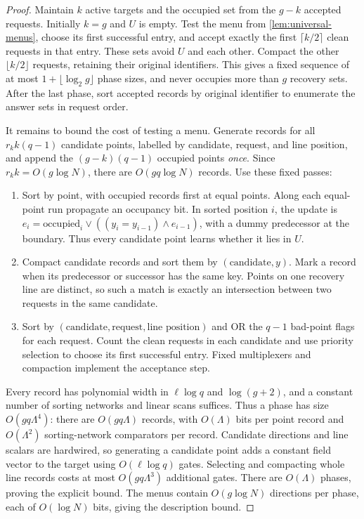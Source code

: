\documentclass[11pt]{article}
\begin{document}
\begin{proof}
Maintain $k$ active targets and the occupied set from the $g-k$ accepted
requests.  Initially $k=g$ and $U$ is empty.  Test the menu from
\cref{lem:universal-menus}, choose its first successful entry, and accept
exactly the first $\lceil k/2\rceil$ clean requests in that entry.  These
sets avoid $U$ and each other.  Compact the other $\lfloor k/2\rfloor$
requests, retaining their original identifiers.  This gives a fixed sequence
of at most $1+\lfloor\log_2 g\rfloor$ phase sizes, and never occupies more
than $g$ recovery sets.  After the last phase, sort accepted records by original
identifier to enumerate the answer sets in request order.

It remains to bound the cost of testing a menu.  Generate records for all
$r_k k(q-1)$ candidate points, labelled by candidate, request, and line
position, and append the $(g-k)(q-1)$ occupied points \emph{once}.  Since
$r_k k=O(g\log N)$, there are $O(gq\log N)$ records.  Use these fixed passes:
\begin{enumerate}[label=\textup{(\roman*)},leftmargin=2.1em]
\item Sort by point, with occupied records first at equal points.  Along each
equal-point run propagate an occupancy bit.  In sorted position $i$, the
update is $e_i=\mathrm{occupied}_i\vee
((y_i=y_{i-1})\wedge e_{i-1})$, with a dummy predecessor at the boundary.
Thus every candidate point learns whether it lies in $U$.
\item Compact candidate records and sort them by $(\text{candidate},y)$.
Mark a record when its predecessor or successor has the same key.  Points on
one recovery line are distinct, so such a match is exactly an intersection
between two requests in the same candidate.
\item Sort by $(\text{candidate},\text{request},\text{line position})$ and
OR the $q-1$ bad-point flags for each request.  Count the clean requests in
each candidate and use priority selection to choose its first successful
entry.  Fixed multiplexers and compaction implement the acceptance step.
\end{enumerate}
Every record has polynomial width in $\ell\log q$ and $\log(g+2)$, and a
constant number of sorting networks and linear scans suffices.  Thus a phase
has size $O(gq\Lambda^4)$: there are $O(gq\Lambda)$ records, with
$O(\Lambda)$ bits per point record and $O(\Lambda^2)$ sorting-network
comparators per record.  Candidate directions and line scalars are hardwired,
so generating a candidate point adds a constant field vector to the target
using $O(\ell\log q)$ gates.  Selecting and compacting whole line records
costs at most $O(gq\Lambda^3)$ additional gates.  There are $O(\Lambda)$
phases, proving the explicit bound.  The menus contain
$O(g\log N)$ directions per phase,
each of $O(\log N)$ bits, giving the description bound.
\end{proof}
\end{document}
